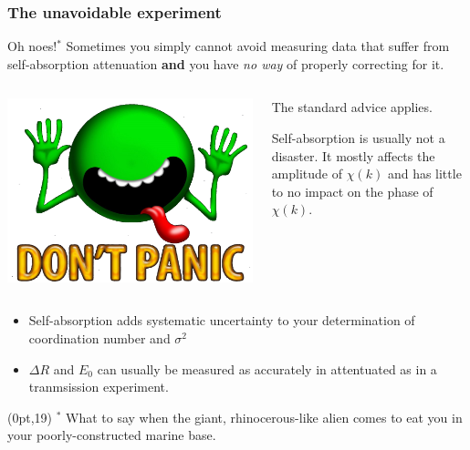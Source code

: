 \documentclass[10pt, xcolor=x11names, compress]{beamer}
\begin{document}
\begin{frame}
  \frametitle{The unavoidable experiment}

  \begin{alertblock}{Oh noes!$^*$}
    Sometimes you simply cannot avoid measuring data that suffer from
    self-absorption attenuation \textbf{and} you have \textit{no way}
    of properly correcting for it.
  \end{alertblock}
  \begin{columns}
    \begin{column}{0.25\linewidth}
      \includegraphics[width=\linewidth]{images/DontPanic.png}      
    \end{column}
    \begin{column}{0.75\linewidth}
      The standard advice applies.
      
      \medskip

      Self-absorption  is usually not a disaster.  It mostly affects
      the amplitude of $\chi(k)$ and has little to no impact on the
      phase of  $\chi(k)$.
    \end{column}
  \end{columns}

  \bigskip

  \begin{itemize}
  \item Self-absorption adds systematic uncertainty to your
    determination of coordination number and $\sigma^2$
  \item $\Delta R$ and $E_0$ can usually be measured as accurately in
    attentuated as in a tranmsission experiment.
  \end{itemize}

  \begin{textblock*}{0.5\linewidth}(0pt,19\TPVertModule)
    \tiny%
    $^*$ What to say when the giant, rhinocerous-like alien comes to eat
    you in your poorly-constructed marine base.

  \end{textblock*}
\end{frame}
\end{document}

